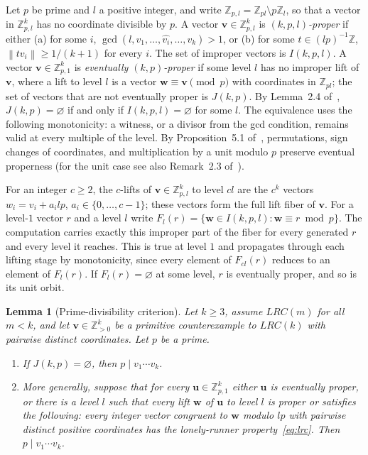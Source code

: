 \documentclass[11pt]{article}
\newtheorem{lemma}[theorem]{Lemma}
\theoremstyle{definition}
\theoremstyle{remark}
\newcommand{\Z}{\mathbb{Z}}
\newcommand{\vct}[1]{\mathbf{#1}}
\newcommand{\nearest}[1]{\left\lVert #1\right\rVert}
\begin{document}
Let $p$ be prime and $l$ a positive integer, and write
$\Z_{p,l}=\Z_{pl}\setminus p\Z_l$, so that a vector in $\Z_{p,l}^k$ has no
coordinate divisible by $p$.  A vector $\vct{v}\in\Z_{p,l}^k$ is
\emph{$(k,p,l)$-proper} if either (a) for some $i$,
$\gcd(l,v_1,\ldots,\widehat{v_i},\ldots,v_k)>1$, or (b) for some
$t\in(lp)^{-1}\Z$, $\nearest{tv_i}\geq1/(k+1)$ for every $i$.  The set of
improper vectors is $I(k,p,l)$.  A vector $\vct{v}\in\Z_{p,1}^k$ is
\emph{eventually $(k,p)$-proper} if some level $l$ has no improper lift of
$\vct{v}$, where a lift to level $l$ is a vector
$\vct{w}\equiv\vct{v}\pmod p$ with coordinates in $\Z_{pl}$; the set of
vectors that are not eventually proper is $J(k,p)$.  By Lemma~2.4
of~\cite{ST26}, $J(k,p)=\varnothing$ if and only if $I(k,p,l)=\varnothing$
for some $l$.  The equivalence uses the following monotonicity: a witness,
or a divisor from the gcd condition, remains valid at every multiple of
the level.  By Proposition~5.1 of~\cite{ST26}, permutations,
sign changes of coordinates, and multiplication by a unit modulo $p$
preserve eventual properness (for the unit case see also Remark~2.3
of~\cite{Allikvere26}).

For an integer $c\geq2$, the $c$-lifts of $\vct{v}\in\Z_{p,l}^k$ to level
$cl$ are the $c^k$ vectors $w_i=v_i+a_ilp$, $a_i\in\{0,\ldots,c-1\}$; these
vectors form the full lift fiber of $\vct{v}$.  For a level-$1$ vector $r$
and a level $l$ write
$F_l(r)=\{\vct{w}\in I(k,p,l):\vct{w}\equiv r\bmod p\}$.  The computation
carries exactly this improper part of the fiber for every generated $r$
and every level it reaches.  This is true at level $1$ and propagates
through each lifting stage by monotonicity, since every element of
$F_{cl}(r)$ reduces to an element of $F_l(r)$.  If $F_l(r)=\varnothing$ at
some level, $r$ is eventually proper, and so is its unit orbit.

\begin{lemma}[Prime-divisibility criterion]\label{lem:gate}
Let $k\geq3$, assume $LRC(m)$ for all $m<k$, and let $\vct{v}\in\Z_{>0}^k$
be a primitive counterexample to $LRC(k)$ with pairwise distinct
coordinates.  Let $p$ be a prime.
\begin{enumerate}[leftmargin=*,label=(\roman*)]
\item If $J(k,p)=\varnothing$, then $p\mid v_1\cdots v_k$.
\item More generally, suppose that for every $\vct{u}\in\Z_{p,1}^k$
  either $\vct{u}$ is eventually proper, or there is a level $l$ such
  that every lift $\vct{w}$ of $\vct{u}$ to level $l$ is proper or
  satisfies the following: every integer vector congruent to $\vct{w}$
  modulo $lp$ with pairwise distinct positive coordinates has the
  lonely-runner property~\eqref{eq:lrc}.  Then $p\mid v_1\cdots v_k$.
\end{enumerate}
\end{lemma}
\end{document}
